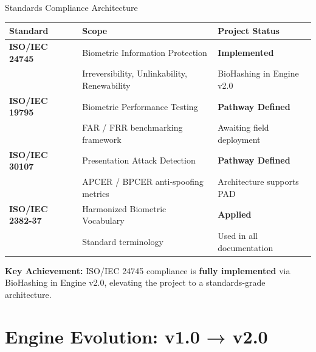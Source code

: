 \documentclass[aspectratio=169, 11pt]{beamer}
\begin{document}
\begin{frame}{Standards Compliance Architecture}
  \begin{center}
    \renewcommand{\arraystretch}{1.3}
    \begin{tabular}{lll}
      \toprule
      \textbf{Standard} & \textbf{Scope} & \textbf{Project Status} \\
      \midrule
      \textbf{ISO/IEC 24745} & Biometric Information Protection & \textcolor{CodeGreen}{\textbf{Implemented}} \\
       & \small Irreversibility, Unlinkability, Renewability & \small BioHashing in Engine v2.0 \\
      \midrule
      \textbf{ISO/IEC 19795} & Biometric Performance Testing & \textcolor{InfoBlue}{\textbf{Pathway Defined}} \\
       & \small FAR / FRR benchmarking framework & \small Awaiting field deployment \\
      \midrule
      \textbf{ISO/IEC 30107} & Presentation Attack Detection & \textcolor{InfoBlue}{\textbf{Pathway Defined}} \\
       & \small APCER / BPCER anti-spoofing metrics & \small Architecture supports PAD \\
      \midrule
      \textbf{ISO/IEC 2382-37} & Harmonized Biometric Vocabulary & \textcolor{CodeGreen}{\textbf{Applied}} \\
       & \small Standard terminology & \small Used in all documentation \\
      \bottomrule
    \end{tabular}
  \end{center}
  \vspace{0.3em}
  \begin{center}
    \colorbox{PrimaryBlue!10}{\parbox{0.85\textwidth}{\centering\small
      \textbf{Key Achievement:} ISO/IEC 24745 compliance is \textbf{fully implemented} via BioHashing in Engine v2.0, elevating the project to a standards-grade architecture.
    }}
  \end{center}
\end{frame}

\section{Engine Evolution: v1.0 → v2.0}
\end{document}
